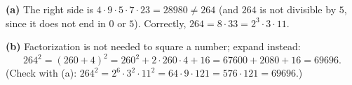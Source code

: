 \textbf{(a)} The right side is $4\cdot9\cdot5\cdot7\cdot23=28980\ne264$ (and $264$ is not divisible by $5$, since it does not end in $0$ or $5$). Correctly, $264=8\cdot33=\boxed{2^3\cdot3\cdot11}$.

\textbf{(b)} Factorization is not needed to square a number; expand instead:
\[
264^2=(260+4)^2=260^2+2\cdot260\cdot4+16=67600+2080+16=\boxed{69696}.
\]
(Check with (a): $264^2=2^6\cdot3^2\cdot11^2=64\cdot9\cdot121=576\cdot121=69696$.)
